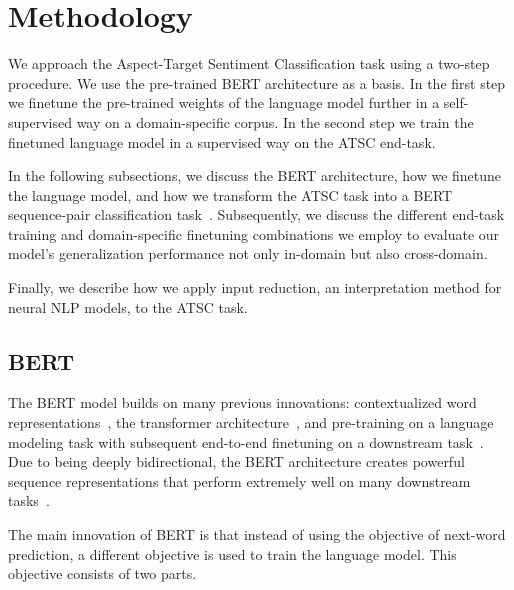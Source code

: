 \documentclass[11pt,a4paper]{article}
\newcommand{\rood}[1]{}
\begin{document}
\section{Methodology}
\rood{Outcome: Overview of the Subsections. Reader Should understand
  that in order to train our task we use the pipeline of using pre-trained
  bert, than language model finetuning and training in the mode for aspect based sentiment analysis. Tell that this is not new and has been 
  used in posttraining paper and also in BERT-pair paper.
  Tell the novel thing is that we research the influence of number of iterations,
  how out of domain generalization error is influenced by the LM-domain.
  Keep the first three subsections short, because its not our contribution.
}
We approach the Aspect-Target Sentiment Classification task using 
a two-step procedure. We use the pre-trained BERT architecture as a basis. In the first step we finetune the pre-trained weights of the language model further in a self-supervised way on a domain-specific corpus. In the second step we train the finetuned language model in a supervised way on the ATSC end-task. 

In the following subsections, we discuss the BERT architecture, how we finetune the language model, and how we transform the ATSC task into a BERT sequence-pair classification task~\cite{Sun2019}.
Subsequently, we discuss the different end-task training and domain-specific finetuning combinations
we employ to evaluate our model's generalization performance not only in-domain but also cross-domain.

Finally, we describe how we apply input reduction, an interpretation method for neural NLP models, to the ATSC task.
\subsection{BERT}
\rood{Outcome: Readers should understand that we use bert-base and 
  use the pre-trained weights and its architecture}

The BERT model builds on many previous innovations: contextualized word representations~\cite{Peters2018}, the transformer architecture~\cite{Vaswani2017}, and pre-training on a language modeling task with subsequent end-to-end finetuning on a downstream task~\cite{Radford2018, Howard}.
Due to being deeply bidirectional, the BERT architecture creates powerful sequence representations that perform extremely well on many downstream tasks~\cite{Devlin2019}.

The main innovation of BERT is that instead of using the objective of next-word prediction, a different objective is used to train the language model.
This objective consists of two parts.
\end{document}

